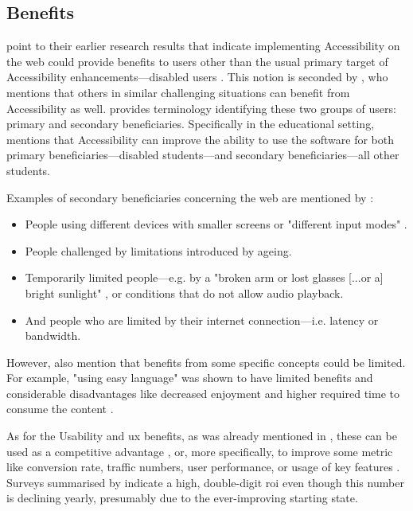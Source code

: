 \subsection{Benefits}
\label{Literature-HSIE-Benefits}

\textcite{Juergen_et_all_2020} point to their earlier research results that indicate implementing Accessibility on the web could provide benefits to users other than the usual primary target of Accessibility enhancements---disabled users \parencite{Schmutz_Sonderegger_Sauer_2016, Schmutz_Sonderegger_Sauer_2017, Schmutz_Sonderegger_Sauer_2018}.
This notion is seconded by \textcite{Vanderheiden_2000}, who mentions that others in similar challenging situations can benefit from Accessibility as well.
\textcite{Edyburn_2010} provides terminology identifying these two groups of users: primary and secondary beneficiaries. Specifically in the educational setting, \textcite{Edyburn_2021} mentions that Accessibility can improve the ability to use the software for both primary beneficiaries---disabled students---and secondary beneficiaries---all other students.

Examples of secondary beneficiaries concerning the web are mentioned by \textcite{WAI_Intro}:

\begin{itemize}
    \item People using different devices with smaller screens or "different input modes" \parencite{WAI_Intro}.
    \item People challenged by limitations introduced by ageing.
    \item Temporarily limited people---e.g. by a "broken arm or lost glasses [...or a] bright sunlight" \parencite{WAI_Intro}, or conditions that do not allow audio playback.
    \item And people who are limited by their internet connection---i.e. latency or bandwidth.
\end{itemize}

However, \textcite{Juergen_et_all_2020} also mention that benefits from some specific concepts could be limited. For example, "using easy language" \parencite[p. 1210]{Juergen_et_all_2020} was shown to have limited benefits and considerable disadvantages like decreased enjoyment and higher required time to consume the content \parencite{Schmutz_Sonderegger_Sauer_2019}.

As for the Usability and \gls{ux} benefits, as was already mentioned in , these can be used as a competitive advantage \parencite{Wegge_Zimmermann_2007}, or, more specifically, to improve some metric like conversion rate, traffic numbers, user performance, or usage of key features \parencite{Nielsen_2008}.
Surveys summarised by \textcite{Nielsen_2008} indicate a high, double-digit \gls{roi} even though this number is declining yearly, presumably due to the ever-improving starting state.

